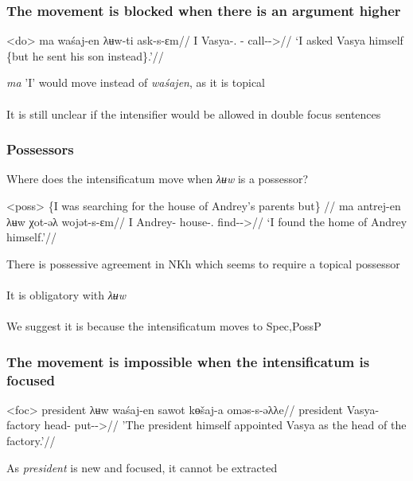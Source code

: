 \documentclass{beamer}
\begin{document}
\begin{frame}
    \frametitle{The movement is blocked when there is an argument higher}

    \ex<do> \begingl
        \gla \ljudge*ma waśaj-en λʉw-ti ask-s-ɛm//
        \glb I Vasya-\Poss{}.\Ssg{} \Int-\Acc{} call-\Pst{}-\Fsg{}>\Sg{}//
        \glft ‘I asked Vasya himself \{but he sent his son instead\}.'//
        \endgl
    \xe

    \textit{ma} 'I' would move instead of \textit{waśajen}, as it is topical\\~\\

    It is still unclear if the intensifier would be allowed in double focus sentences
\end{frame}    


\begin{frame}
    \frametitle{Possessors}
    
    Where does the intensificatum move when \textit{λʉw} is a possessor?
    
    \ex<poss> \begingl
        \glpreamble \{I was searching for the house of Andrey's parents but\} //
        \gla ma antrej-en		λʉw	χot-əλ		wojət-s-ɛm//
        \glb I Andrey-\Pssg{}	\Int{}	house-\Poss.\Tsg{} find-\Pst-\Fsg>\Sg{}//
        \glft ‘I found the home of Andrey himself.’//
        \endgl
        \xe
        
    There is possessive agreement in NKh which seems to require a topical possessor\\~\\

    It is obligatory with \textit{λʉw}\\~\\
    
    We suggest it is because the intensificatum moves to Spec,PossP
\end{frame}

\begin{frame}
    \frametitle{The movement is impossible when the intensificatum is focused}
    
    \ex<foc>\begingl
    \gla\ljudge{*}president λʉw waśaj-en sawot kɵšaj-a oməs-s-əλλe//
    \glb president \Int{} Vasya-\Pssg{} factory head-\Dat{} put-\Pst{}-\Tsg{}>\Sg{}//
    \glft 'The president himself appointed Vasya as the head of the factory.'//
    \endgl
    \xe
    
    As \textit{president} is new and focused, it cannot be extracted
    
\end{frame}
\end{document}
